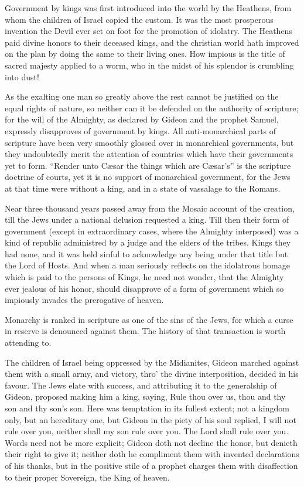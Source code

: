\documentclass[12pt,oneside]{memoir}
\begin{document}
Government by kings was first introduced into the world by the
Heathens, from whom the children of Israel copied the custom. It was
the most prosperous invention the Devil ever set on foot for the
promotion of idolatry. The Heathens paid divine honors to their 
deceased kings, and the christian world hath improved on the plan by
doing the same to their living ones. How impious is the title of
sacred majesty applied to a worm, who in the midst of his splendor
is crumbling into dust!

As the exalting one man so greatly above the rest cannot be
justified on the equal rights of nature, so neither can it be
defended on the authority of scripture; for the will of the Almighty,
as declared by Gideon and the prophet Samuel, expressly disapproves
of government by kings. All anti-monarchical parts of scripture have
been very smoothly glossed over in monarchical governments, but they
undoubtedly merit the attention of countries which have their
governments yet to form. ``Render unto Cæsar the things which are
Cæsar's'' is the scripture doctrine of courts, yet it is no support
of monarchical government, for the Jews at that time were without a
king, and in a state of vassalage to the Romans.

Near three thousand years passed away from the Mosaic account of the
creation, till the Jews under a national delusion requested a king.
Till then their form of government (except in extraordinary cases,
where the Almighty interposed) was a kind of republic administred by
a judge and the elders of the tribes. Kings they had none, and it
was held sinful to acknowledge any being under that title but the
Lord of Hosts. And when a man seriously reflects on the idolatrous
homage which is paid to the persons of Kings, he need not wonder,
that the Almighty ever jealous of his honor, should disapprove of a
form of government which so impiously invades the prerogative of
heaven.

Monarchy is ranked in scripture as one of the sins of the Jews, for
which a curse in reserve is denounced against them. The history of
that transaction is worth attending to.

The children of Israel being oppressed by the Midianites, Gideon
marched against them with a small army, and victory, thro' the
divine interposition, decided in his favour. The Jews elate with
success, and attributing it to the generalship of Gideon, proposed
making him a king, saying, Rule thou over us, thou and thy son and
thy son's son. Here was temptation in its fullest extent; not a
kingdom only, but an hereditary one, but Gideon in the piety of his
soul replied, I will not rule over you, neither shall my son rule
over you. The Lord shall rule over you. Words need not be more
explicit; Gideon doth not decline the honor, but denieth their right
to give it; neither doth he compliment them with invented
declarations of his thanks, but in the positive stile of a prophet
charges them with disaffection to their proper Sovereign, the King
of heaven.
\end{document}
